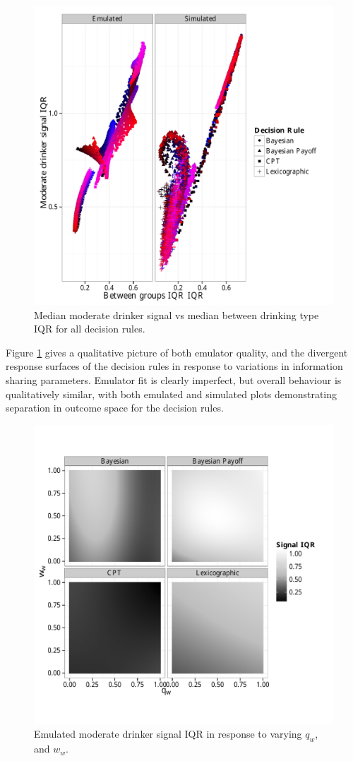 \begin{figure}[H]
\begin{adjustbox}{center}\includegraphics[width=0.8\linewidth]{figures/sharing_emulated_simulated}\end{adjustbox}
\caption{Median moderate drinker signal vs median between drinking type IQR for all decision rules.}
\label{fig:outcome_plots}
\end{figure}

Figure \ref{fig:outcome_plots} gives a qualitative picture of both emulator quality, and the divergent response surfaces of the decision rules in response to variations in information sharing parameters. Emulator fit is clearly imperfect, but overall behaviour is qualitatively similar, with both emulated and simulated plots demonstrating separation in outcome space for the decision rules.

\begin{figure}[H]
\begin{adjustbox}{center}\includegraphics[width=0.8\linewidth]{figures/unfixed_emu_sig_iqr}\end{adjustbox}
\caption{Emulated moderate drinker signal IQR in response to varying \(q_{w}\), and \(w_{w}\).}
\label{fig:emulated_sharing_iqr}
\end{figure}

